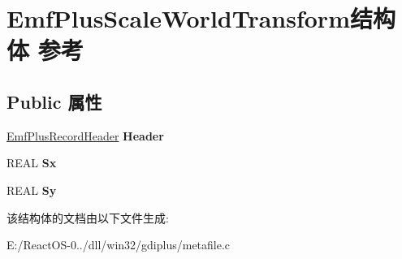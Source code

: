 \hypertarget{struct_emf_plus_scale_world_transform}{}\section{Emf\+Plus\+Scale\+World\+Transform结构体 参考}
\label{struct_emf_plus_scale_world_transform}
\subsection*{Public 属性}
\begin{DoxyCompactItemize}
\item 
\mbox{\label{struct_emf_plus_scale_world_transform_a0152165f2a16ca6df0ffb48ad7c59104}} 
\hyperlink{struct_emf_plus_record_header}{Emf\+Plus\+Record\+Header} {\bfseries Header}
\item 
\mbox{\label{struct_emf_plus_scale_world_transform_aa46137d2319cb06df1ae1159048805d9}} 
R\+E\+AL {\bfseries Sx}
\item 
\mbox{\label{struct_emf_plus_scale_world_transform_a94caedd6771a8aab844ffbcc15703aac}} 
R\+E\+AL {\bfseries Sy}
\end{DoxyCompactItemize}


该结构体的文档由以下文件生成\+:\begin{DoxyCompactItemize}
\item 
E\+:/\+React\+O\+S-\/0../dll/win32/gdiplus/metafile.\+c\end{DoxyCompactItemize}
